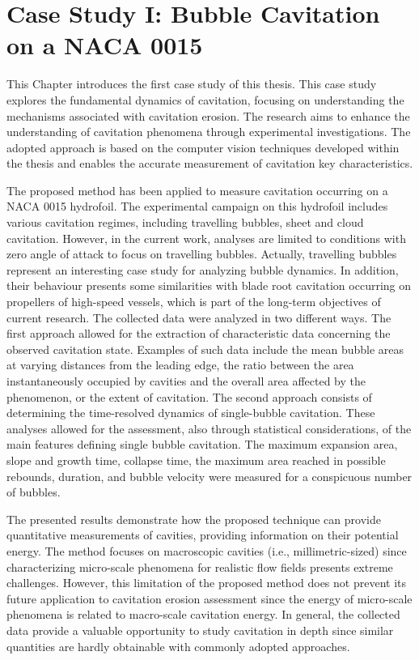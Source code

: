 \chapter{Case Study I: Bubble Cavitation on a NACA 0015}
\label{chap:chapter5}

This Chapter introduces the first case study of this thesis. This case study explores the fundamental dynamics of cavitation, focusing on understanding the mechanisms associated with cavitation erosion.
The research aims to enhance the understanding of cavitation phenomena through experimental investigations. The adopted approach is based on the computer vision techniques developed within the thesis and enables the accurate measurement of cavitation key characteristics.

The proposed method has been applied to measure cavitation occurring on a NACA 0015 hydrofoil. The experimental campaign on this hydrofoil includes various cavitation regimes, including travelling bubbles, sheet and cloud cavitation. However, in the current work, analyses are limited to conditions with zero angle of attack to focus on travelling bubbles.
Actually, travelling bubbles represent an interesting case study for analyzing bubble dynamics. In addition, their behaviour presents some similarities with blade root cavitation occurring on propellers of high-speed vessels, which is part of the long-term objectives of current research.
The collected data were analyzed in two different ways. The first approach allowed for the extraction of characteristic data concerning the observed cavitation state. Examples of such data include the mean bubble areas at varying distances from the leading edge, the ratio between the area instantaneously occupied by cavities and the overall area affected by the phenomenon, or the extent of cavitation.
The second approach consists of determining the time-resolved dynamics of single-bubble cavitation. These analyses allowed for the assessment, also through statistical considerations, of the main features defining single bubble cavitation. The maximum expansion area, slope and growth time, collapse time, the maximum area reached in possible rebounds, duration, and bubble velocity were measured for a conspicuous number of bubbles.

The presented results demonstrate how the proposed technique can provide quantitative measurements of cavities, providing information on their potential energy. The method focuses on macroscopic cavities (i.e., millimetric-sized) since characterizing micro-scale phenomena for realistic flow fields presents extreme challenges. However, this limitation of the proposed method does not prevent its future application to cavitation erosion assessment since the energy of micro-scale phenomena is related to macro-scale cavitation energy.
In general, the collected data provide a valuable opportunity to study cavitation in depth since similar quantities are hardly obtainable with commonly adopted approaches.


